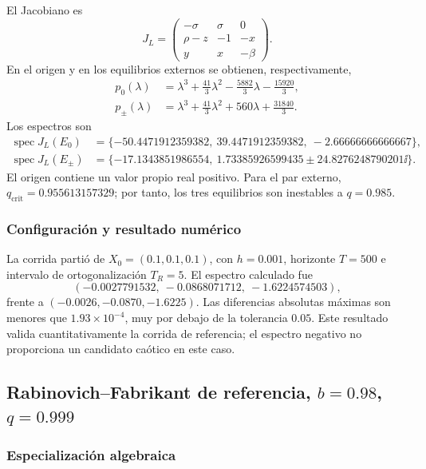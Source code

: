 El Jacobiano es
\begin{equation}
 J_L=\begin{pmatrix}
 -\sigma&\sigma&0\\
 \rho-z&-1&-x\\
 y&x&-\beta
 \end{pmatrix}.
\end{equation}
En el origen y en los equilibrios externos se obtienen, respectivamente,
\begin{align}
 p_0(\lambda)&=\lambda^3+\frac{41}{3}\lambda^2
 -\frac{5882}{3}\lambda-\frac{15920}{3},\\
 p_{\pm}(\lambda)&=\lambda^3+\frac{41}{3}\lambda^2
 +560\lambda+\frac{31840}{3}.
\end{align}
Los espectros son
\begin{align}
 \operatorname{spec}J_L(E_0)&=
 \{-50.4471912359382,\ 39.4471912359382,\ -2.66666666666667\},\\
 \operatorname{spec}J_L(E_{\pm})&=
 \{-17.1343851986554,\ 1.73385926599435
 \pm24.8276248790201\ii\}.
\end{align}
El origen contiene un valor propio real positivo. Para el par externo,
\(q_{\mathrm{crit}}=0.955613157329\); por tanto, los tres equilibrios son
inestables a \(q=0.985\).

\subsubsection*{Configuración y resultado numérico}

La corrida partió de \(X_0=(0.1,0.1,0.1)\), con \(h=0.001\), horizonte
\(T=500\) e intervalo de ortogonalización \(T_R=5\). El espectro calculado fue
\begin{equation}
 (-0.0027791532,\ -0.0868071712,\ -1.6224574503),
\end{equation}
frente a \((-0.0026,-0.0870,-1.6225)\). Las diferencias absolutas máximas son
menores que \(1.93\times10^{-4}\), muy por debajo de la tolerancia \(0.05\).
Este resultado valida cuantitativamente la corrida de referencia; el espectro
negativo no proporciona un candidato caótico en este caso.

\subsection{Rabinovich--Fabrikant de referencia,
\texorpdfstring{\(b=0.98\), \(q=0.999\)}{b=0.98, q=0.999}}

\subsubsection*{Especialización algebraica}

